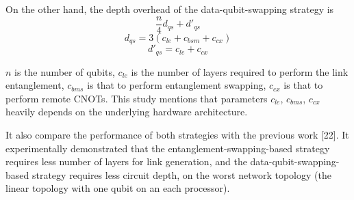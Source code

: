   On the other hand, the depth overhead of the data-qubit-swapping strategy is 
  $$ \frac{n}{4}d_{qs} + d'_{qs}$$ 
  $$ d_{qs} = 3(c_{le} + c_{bsm} + c_{cx})$$
  $$ d'_{qs} = c_{le} + c_{cx}$$
  
  $n$ is the number of qubits, $c_{le}$ is the number of layers required to perform the link entanglement, $c_{bms}$ is that to perform entanglement swapping, $c_{cx}$ is that to perform remote CNOTs.
  This study mentions that parameters $c_{le}$, $c_{bms}$, $c_{cx}$ heavily depends on the underlying hardware architecture.
  
  It also compare the performance of both strategies with the previous work [22].  It experimentally demonstrated that the entanglement-swapping-based strategy requires less number of layers for link generation, and the data-qubit-swapping-based strategy requires less circuit depth, on the worst network topology (the linear topology with one qubit on an each processor).


